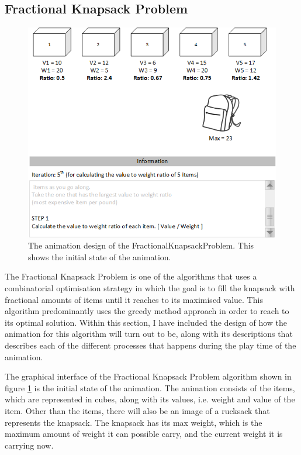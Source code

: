 \subsection{Fractional Knapsack Problem}
\begin{figure}[H]
\centering
\includegraphics[scale=1]{images/report_images/animationDesignFractionalKnapsackProblem_STEP1.png}
\caption{The animation design of the FractionalKnapsackProblem. This shows the initial state of the animation.}
\label{animationDesignFractionalKnapsackProblem}
\end{figure}

The Fractional Knapsack Problem is one of the algorithms that uses a combinatorial optimisation strategy in which the goal is to fill the knapsack with fractional amounts of items until it reaches to its maximised value. This algorithm predominantly uses the greedy method approach in order to reach to its optimal solution. Within this section, I have included the design of how the animation for this algorithm will turn out to be, along with its descriptions that describes each of the different processes that happens during the play time of the animation.

The graphical interface of the Fractional Knapsack Problem algorithm shown in figure \ref{animationDesignFractionalKnapsackProblem} is the initial state of the animation. The animation consists of the items, which are represented in cubes, along with its values, i.e. weight and value of the item. Other than the items, there will also be an image of a rucksack that represents the knapsack. The knapsack has its max weight, which is the maximum amount of weight it can possible carry, and the current weight it is carrying now.

